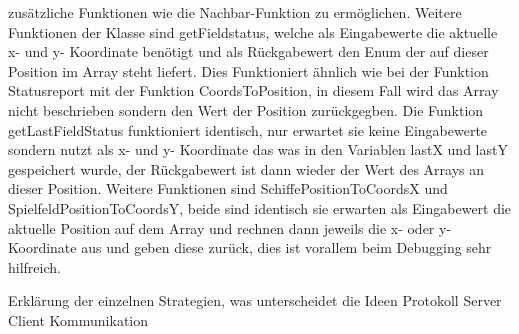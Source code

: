 zusätzliche Funktionen wie die Nachbar-Funktion zu ermöglichen. Weitere Funktionen der Klasse sind getFieldstatus, welche als Eingabewerte die aktuelle x- und y- Koordinate benötigt 
und als Rückgabewert den Enum der auf dieser Position im Array steht liefert. Dies Funktioniert ähnlich wie bei der Funktion Statusreport mit der Funktion CoordsToPosition, in diesem 
Fall wird das Array nicht beschrieben sondern den Wert der Position zurückgegben. Die Funktion getLastFieldStatus funktioniert identisch, nur erwartet sie keine Eingabewerte sondern 
nutzt als x- und y- Koordinate das was in den Variablen lastX und lastY gespeichert wurde, der Rückgabewert ist dann wieder der Wert des Arrays an dieser Position. Weitere Funktionen 
sind SchiffePositionToCoordsX und SpielfeldPositionToCoordsY, beide sind identisch sie erwarten als Eingabewert die aktuelle Position auf dem Array und rechnen dann jeweils die x- 
oder y-Koordinate aus und geben diese zurück, dies ist vorallem beim Debugging sehr hilfreich.


Erklärung der einzelnen Strategien, was unterscheidet die Ideen
Protokoll Server Client Kommunikation